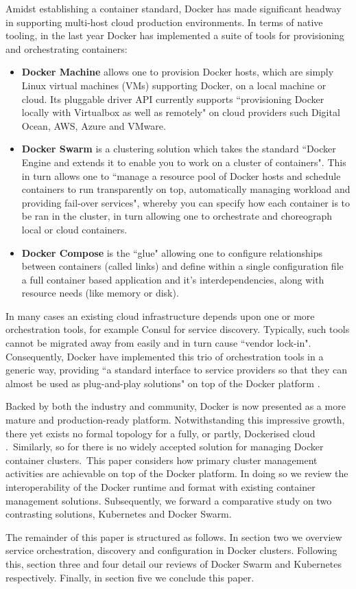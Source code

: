 \documentclass{article}
\begin{document}
\par
Amidst establishing a container standard, Docker has made significant headway in 
supporting multi-host cloud production environments. In terms of native tooling, in the last year Docker has implemented
a suite of tools for provisioning and orchestrating containers:
\begin{itemize}
\item \textbf{Docker Machine} allows one to provision Docker hosts, which are simply Linux virtual machines (VMs) supporting Docker, on a local machine or cloud. 
Its pluggable driver API currently supports ``provisioning Docker locally with Virtualbox as well as remotely" on cloud providers such Digital Ocean, AWS, Azure and VMware.
\item \textbf{Docker Swarm} is a clustering solution which takes the standard 
``Docker Engine and extends it to enable you to work on a cluster of containers". 
This in turn allows one to ``manage a resource pool of Docker hosts and schedule
containers to run transparently on top, automatically managing workload and providing fail-over services", whereby you can specify how each container is to be ran in the cluster, in turn allowing one to orchestrate and choreograph local or cloud containers.
\item \textbf{Docker Compose} is the ``glue" allowing one to configure relationships between containers (called links) and define within a single configuration file a full container based application and it's interdependencies, along with resource needs (like memory or disk).
\end{itemize}
\noindent In many cases an existing cloud infrastructure depends upon one or more orchestration tools, for example 
Consul for service discovery. Typically, such tools cannot be migrated away from easily and in turn cause ``vendor lock-in".
Consequently, Docker have implemented this trio of orchestration tools in a generic way, 
providing ``a standard interface to service providers so that they can almost be used as plug-and-play solutions" on top of the Docker platform \citep{holla}.
\par
Backed by both the industry and community, Docker is now presented as a more mature and production-ready
platform. Notwithstanding this impressive growth, there yet exists no
formal topology for a fully, or partly, Dockerised cloud \citep{Claus}.\ Similarly,
so for there is no widely accepted solution for managing 
Docker container clusters.\
 This paper considers how primary cluster management activities are achievable on top of the Docker platform.
In doing so we review the interoperability of the Docker runtime and format with existing 
container management solutions. Subsequently, we forward a comparative study
on two contrasting solutions, Kubernetes and Docker Swarm. 
\par
The remainder of this paper is structured as follows. In
section two we overview service orchestration, discovery and configuration in Docker clusters. Following this, section three and four detail our
reviews of Docker Swarm and Kubernetes respectively. Finally, in section five we conclude this paper.
\end{document}
